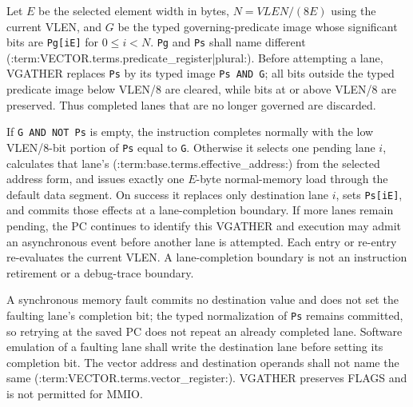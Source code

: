 Let $E$ be the selected element width in bytes, $N=VLEN/(8E)$ using the
current VLEN, and $G$ be
the typed governing-predicate image whose significant bits are
\texttt{Pg[iE]} for $0\leq i<N$.  \texttt{Pg} and \texttt{Ps} shall name
different (:term:VECTOR.terms.predicate_register|plural:).  Before attempting a lane, VGATHER replaces
\texttt{Ps} by its typed image \texttt{Ps AND G}; all bits outside the typed
predicate image below VLEN/8 are cleared, while bits at or above VLEN/8 are
preserved. Thus completed lanes that are no longer governed are discarded.

If \texttt{G AND NOT Ps} is empty, the instruction completes normally with
the low VLEN/8-bit portion of \texttt{Ps} equal to \texttt{G}. Otherwise it selects one pending lane $i$, calculates that
lane's (:term:base.terms.effective_address:) from the selected address form, and issues exactly one $E$-byte
normal-memory load through the default data segment.  On success it replaces
only destination lane $i$, sets \texttt{Ps[iE]}, and commits those effects at
a lane-completion boundary.  If more lanes remain pending, the PC continues to
identify this VGATHER and execution may admit an asynchronous event before
another lane is attempted. Each entry or re-entry re-evaluates the current
VLEN. A lane-completion boundary is not an instruction
retirement or a debug-trace boundary.

A synchronous memory fault commits no destination value and does not set the
faulting lane's completion bit; the typed normalization of \texttt{Ps} remains
committed, so retrying at the saved PC does not repeat an already completed
lane.  Software emulation of a faulting lane shall write the destination lane
before setting its completion bit.  The vector address and destination
operands shall not name the same (:term:VECTOR.terms.vector_register:).  VGATHER preserves FLAGS and
is not permitted for MMIO.
